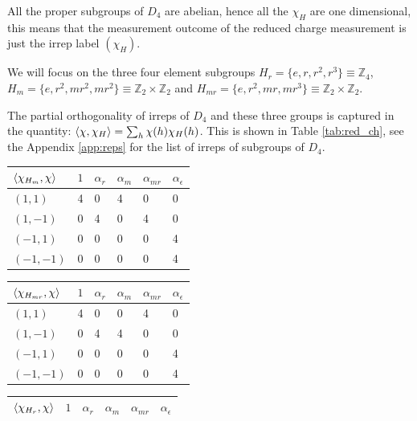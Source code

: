 \documentclass[two column]{article}
\begin{document}
All the proper subgroups of $D_4$ are abelian, hence all the $\chi_H$ are one dimensional, this means that the measurement outcome of the reduced charge measurement is just the irrep label $(\chi_H)$.

We will focus on the three four element subgroups $H_r = \{e, r, r^2, r^3\} \equiv \mathbb{Z}_4$, $H_m = \{e, r^2, mr^2, mr^2\} \equiv \mathbb{Z}_2 \times \mathbb{Z}_2$ and $H_{mr} = \{e, r^2, mr, mr^3\} \equiv \mathbb{Z}_2 \times \mathbb{Z}_2$.

The partial orthogonality of irreps of $D_4$ and these three groups is captured in the quantity: $ \braket{\chi, \chi_H} = \sum_h \chi(h)\chi_H(h)$. This is shown in Table \ref{tab:red_ch}, see the Appendix \ref{app:reps} for the list of irreps of subgroups of $D_4$.


\begin{table}[h]
\centering
\begin{tabular}{l|lllll}
  $\braket{\chi_{H_m}, \chi}$ & $1$ & $\alpha_{r}$ & $\alpha_{m}$ & $\alpha_{mr}$ & $\alpha_{\epsilon}$ \\ \hline
$(1,1)$ & 4   & 0            & 4             & 0               & 0                   \\ 
$ (1,-1)$ & 0   & 4            & 0             & 4               & 0                   \\ 
$(-1,1)$ & 0   & 0            & 0             & 0               & 4                   \\ 
$(-1,-1)$ & 0   & 0            & 0             & 0               & 4                   \\ 
\end{tabular}
\begin{tabular}{l|lllll}
  $\braket{\chi_{H_{mr}}, \chi}$ & $1$ & $\alpha_{r}$ & $\alpha_{m}$ & $\alpha_{mr}$ & $\alpha_{\epsilon}$ \\ \hline
$(1,1)$ & 4   & 0            & 0             & 4               & 0                   \\ 
$ (1,-1)$ & 0   & 4            & 4             & 0               & 0                   \\ 
$(-1,1)$ & 0   & 0            & 0             & 0               & 4                   \\ 
$(-1,-1)$ & 0   & 0            & 0             & 0               & 4                   \\ 
\end{tabular}
\begin{tabular}{l|lllll}
  $\braket{\chi_{H_r}, \chi}$ & $1$ & $\alpha_{r}$ & $\alpha_{m}$ & $\alpha_{mr}$ & $\alpha_{\epsilon}$ \\ \hline

\end{tabular}
\end{table}
\end{document}
